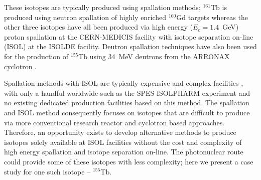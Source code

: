 \documentclass[../main.tex]{subfiles}
\begin{document}
These isotopes are typically produced using spallation methods; $^{161}\mathrm{Tb}$ is produced using neutron spallation of highly enriched $^{160}\mathrm{Gd}$ targets \cite{lehenberger2011low} whereas the other three isotopes have all been produced via high energy ($E_{e} = 1.4$~\si{\giga\electronvolt}) proton spallation \cite{muller2012unique} at the CERN-MEDICIS facility \cite{dos2014cern} with isotope separation on-line (ISOL) at the ISOLDE \cite{catherall2017isolde} facility. Deutron spallation techniques have also been used for the production of $^{155}\mathrm{Tb}$ using 34~\si{\mega\electronvolt} deutrons from the ARRONAX cyclotron \cite{duchemin2016deuteron}. 

Spallation methods with ISOL are typically expensive and complex facilities \cite{duchemin2016deuteron}, with only a handful worldwide such as the SPES-ISOLPHARM experiment \cite{andrighetto2019isolpharm} and no existing dedicated production facilities based on this method. The spallation and ISOL method consequently focuses on isotopes that are difficult to produce via more conventional research reactor and cyclotron based approaches. Therefore, an opportunity exists to develop alternative methods to produce isotopes solely available at ISOL facilities without the cost and complexity of high energy spallation and isotope separation on-line. The photonuclear route could provide some of these isotopes with less complexity; here we present a case study for one such isotope -- $^{155}\mathrm{Tb}$.
\end{document}
